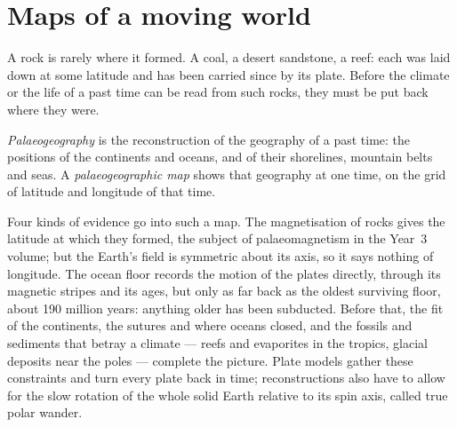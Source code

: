 \section{Maps of a moving world}\label{sec:b2:phanerozoic-earth:maps}

A rock is rarely where it formed. A coal, a desert sandstone, a reef: each was laid down at
some latitude and has been carried since by its plate. Before the climate or the life of a past
time can be read from such rocks, they must be put back where they were.

\begin{definition}\label{def:b2:phanerozoic-earth:palaeogeography}
\emph{Palaeogeography} is the reconstruction of the geography of a past
time: the positions of the continents and oceans, and of their shorelines, mountain belts and
seas. A \emph{palaeogeographic map} shows that geography at one
time, on the grid of latitude and longitude of that time.
\end{definition}

Four kinds of evidence go into such a map. The magnetisation of rocks gives the latitude at
which they formed, the subject of palaeomagnetism in the Year~3 volume; but the Earth's field is
symmetric about its axis, so it says nothing of longitude. The ocean floor records the motion of
the plates directly, through its magnetic stripes and its ages, but only as far back as the
oldest surviving floor, about 190 million years: anything older has been subducted. Before that,
the fit of the continents, the sutures and  where oceans closed, and the fossils and
sediments that betray a climate --- reefs and evaporites in the tropics, glacial deposits near the
poles --- complete the picture. Plate models gather these constraints and turn every plate back in
time; reconstructions also have to allow for the slow rotation of the whole solid Earth relative
to its spin axis, called true polar wander.

